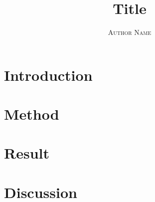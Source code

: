 \documentclass{article}
\title{\vspace{-3.5cm} Title
}
\author{%
	\large 
	\textsc{Author Name}\\
	\vspace{-5mm}
	}
\begin{document}
\maketitle

\section*{Introduction}

\section*{Method}

\section*{Result}

\section*{Discussion}
\end{document}

